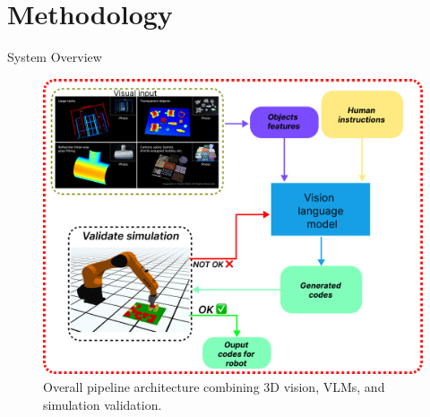 \documentclass{beamer}
\begin{document}
\section{Methodology} 

\begin{frame}{System Overview}
    \begin{figure}
        \centering
        \includegraphics[width=.8\linewidth]{OJT_fig_1.png}
        \caption{Overall pipeline architecture combining 3D vision, VLMs, and simulation validation.}
    \end{figure}	
\end{frame}
\end{document}
